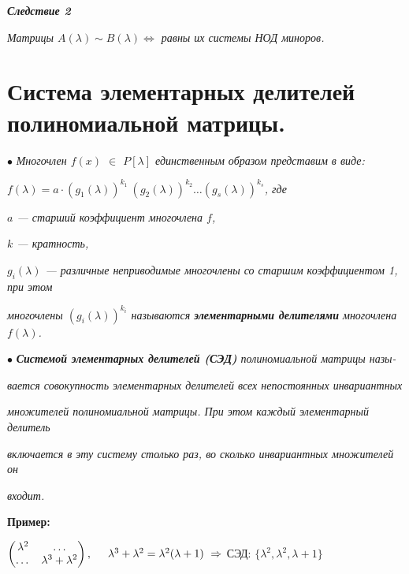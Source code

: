 \documentclass[a4paper, 12pt]{report}
\begin{document}
	\par\bigskip
	\textit{\textbf{Следствие 2}}
	
	\textit{Матрицы $A(\lambda) \sim B(\lambda) \Longleftrightarrow$ равны их системы НОД миноров.}
	
	
	
	
	
	
	
	
	
	
	
	
	\section{Система элементарных делителей полиномиальной матрицы.}
	
	\hspace{0.5 cm}$\bullet$ \textit{Многочлен $f(x)$ $\in$ $P[\lambda]$ единственным образом представим в виде:}
	
	\textit{$f(\lambda) = a \cdot (g_1(\lambda))^{k_1} \ (g_2(\lambda))^{k_2} \dots (g_s(\lambda))^{k_s}$, где}
	
	\textit{$a$ --- старший коэффициент многочлена $f$,}
	
	\textit{$k$ --- кратность, }
	
	\textit{$g_i(\lambda)$ --- различные неприводимые многочлены со старшим коэффициентом 1, при этом}
	
	\textit{многочлены $(g_i(\lambda))^{k_i}$ называются \textit{\textbf{элементарными делителями}} многочлена $f(\lambda)$.}
	
	\par\bigskip
	
	$\bullet$ \textit{\textbf{ Системой элементарных делителей (СЭД)} полиномиальной матрицы назы-}
	
	\textit{вается совокупность элементарных делителей всех непостоянных инвариантных}
	
	\textit{множителей полиномиальной матрицы. При этом каждый элементарный делитель}
	
	\textit{включается в эту систему столько раз, во сколько инвариантных множителей он}
	
	\textit{входит.}
	
	\par\bigskip
	
	\textbf{Пример:}
	
	$\begin{pmatrix} \lambda^2 & \dots \\ \dots & \lambda^3 + \lambda^2 \end{pmatrix}, \hspace{0.5 cm}  \lambda^3 + \lambda^2 = \lambda^2(\lambda+1) \ \Rightarrow$ СЭД: $\{\lambda^2, \lambda^2, \lambda + 1\}$
	
\end{document}
